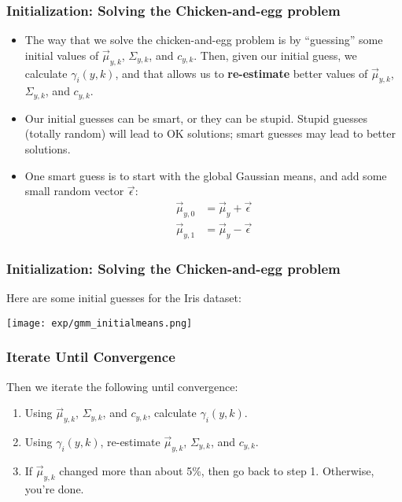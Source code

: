 \documentclass{beamer}
\begin{document}
\begin{frame}
  \frametitle{Initialization: Solving the Chicken-and-egg problem}

  \begin{itemize}
    \item 
      The way that we solve the chicken-and-egg problem is by
      ``guessing'' some initial values of $\vec\mu_{y,k}$,
      $\Sigma_{y,k}$, and $c_{y,k}$.  Then, given our initial guess,
      we calculate $\gamma_i(y,k)$, and that allows us to {\bf
        re-estimate} better values of $\vec\mu_{y,k}$,
      $\Sigma_{y,k}$, and $c_{y,k}$.
    \item
      Our initial guesses can be smart, or they can be stupid.  Stupid
      guesses (totally random) will lead to OK solutions; smart
      guesses may lead to better solutions.
    \item
      One smart guess is to start with the global Gaussian means, and
      add some small random vector $\vec\epsilon$:
      \begin{align*}
        \vec\mu_{y,0} &= \vec\mu_y+\vec\epsilon\\
        \vec\mu_{y,1} &= \vec\mu_y-\vec\epsilon
      \end{align*}
  \end{itemize}
\end{frame}

\begin{frame}
  \frametitle{Initialization: Solving the Chicken-and-egg problem}

  Here are some initial guesses for the Iris dataset:
  \centerline{\texttt{[image: exp/gmm\_initialmeans.png]}}
\end{frame}
  
\begin{frame}
  \frametitle{Iterate Until Convergence}

  Then we iterate the following until convergence:
  \begin{enumerate}
  \item
    Using $\vec\mu_{y,k}$, $\Sigma_{y,k}$, and $c_{y,k}$, calculate
    $\gamma_i(y,k)$.
  \item
    Using $\gamma_i(y,k)$, re-estimate $\vec\mu_{y,k}$, $\Sigma_{y,k}$, and $c_{y,k}$.
  \item
    If $\vec\mu_{y,k}$ changed more than about 5\%, then go back to
    step 1.  Otherwise, you're done.
  \end{enumerate}
\end{frame}
\end{document}
